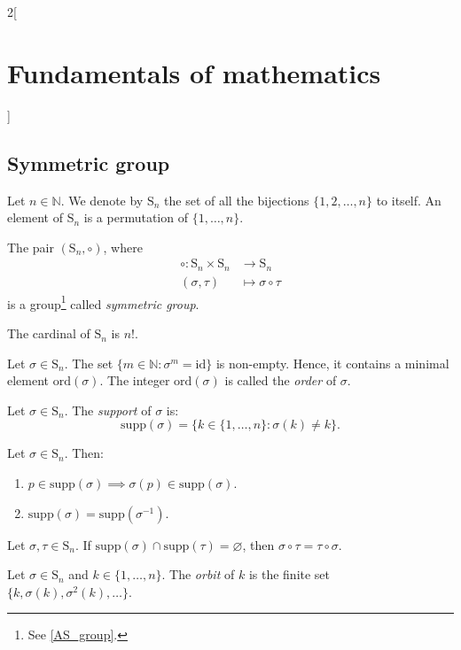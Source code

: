 \documentclass[../../../main.tex]{subfiles}
\begin{document}
\begin{multicols}{2}[\section{Fundamentals of mathematics}]
  \subsection{Symmetric group}
  \begin{definition}
    Let $n\in\mathbb{N}$. We denote by $\text{S}_n$ the set of all the bijections $\{1,2,\ldots,n\}$ to itself. An element of $\text{S}_n$ is a permutation of $\{1,\ldots,n\}$.
  \end{definition}
  \begin{prop}
    The pair $(\text{S}_n,\circ)$, where
    \begin{align*}
      \circ:\text{S}_n\times \text{S}_n & \longrightarrow \text{S}_n \\
      (\sigma,\tau)                     & \longmapsto\sigma\circ\tau
    \end{align*}
    is a group\footnote{See \cref{AS_group}.} called \emph{symmetric group}.
  \end{prop}
  \begin{theorem}
    The cardinal of $\text{S}_n$ is $n!$.
  \end{theorem}
  \begin{definition}
    Let $\sigma\in \text{S}_n$. The set $\{m\in\mathbb{N}:\sigma^m=\text{id}\}$ is non-empty. Hence, it contains a minimal element $\text{ord}(\sigma)$. The integer $\text{ord}(\sigma)$ is called the \emph{order} of $\sigma$.
  \end{definition}
  \begin{definition}
    Let $\sigma\in \text{S}_n$. The \emph{support} of $\sigma$ is: $$\text{supp}(\sigma)=\{k\in\{1,\ldots,n\}: \sigma(k)\ne k\}.$$
  \end{definition}
  \begin{lemma}
    Let $\sigma\in \text{S}_n$. Then:
    \begin{enumerate}
      \item $p\in\text{supp}(\sigma)\implies \sigma(p)\in\text{supp}(\sigma)$.
      \item $\text{supp}(\sigma)=\text{supp}(\sigma^{-1})$.
    \end{enumerate}
  \end{lemma}
  \begin{lemma}
    Let $\sigma,\tau\in \text{S}_n$. If $\text{supp}(\sigma)\cap\text{supp}(\tau)=\varnothing$, then $\sigma\circ \tau=\tau\circ \sigma$.
  \end{lemma}
  \begin{definition}
    Let $\sigma\in \text{S}_n$ and $k\in\{1,\ldots,n\}$. The \emph{orbit} of $k$ is the finite set $\{k,\sigma(k),\sigma^2(k),\ldots\}$.

\end{definition}
\end{multicols}
\end{document}
